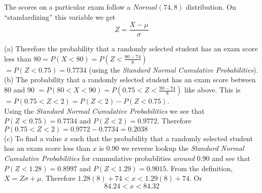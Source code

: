 \documentclass[boxes, qed]{homework}
\begin{document}
\begin{problem}The scores on a particular exam follow a $Normal(74, 8)$ distribution.
  On ``standardizing'' this variable we get
  $$Z=\frac{X-\mu}{\sigma}$$
\end{problem}
\begin{solution}(a) Therefore the probability that a randomly selected student 
  has an exam score less than $80 = P(X<80) = P(Z<\frac{80-74}{8})$\\
  $=P(Z<0.75) = \boxed{0.7734}$ (using the \textit{Standard Normal Cumulative Probabilities}).\\

  (b) The probability that a randomly selected student 
  has an exam score between 80 and 90
  $=P(80 < X < 90) = P(0.75 < Z < \frac{90-74}{8})$ like above.
  This is $=P(0.75 < Z < 2) = P(Z < 2) - P(Z < 0.75)$.\\
  Using the \textit{Standard Normal Cumulative Probabilities} we see that
  $P(Z < 0.75) = 0.7734$ and $P(Z < 2) = 0.9772$. Therefore
  $P(0.75 < Z < 2) = 0.9772 - 0.7734 = \boxed{0.2038}$\\

  (c) To find a value $x$ such that the probability that 
  a randomly selected student has an exam
  score less than $x$ is $0.90$ we reverse lookup
  the \textit{Standard Normal Cumulative Probabilities}
  for cummulative probablities \textit{around} $0.90$ and see that\\

  $P(Z<1.28) = 0.8997$ and $P(Z<1.29) = 0.9015$.
  From the definition, $X=Z\sigma + \mu$. Therefore
  $1.28(8)+74<x<1.29(8)+74$. Or
  $$84.24<x<84.32$$
\end{solution}
\end{document}
